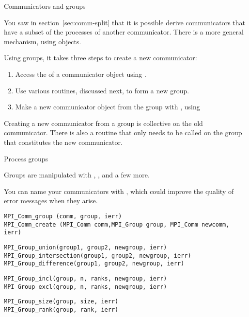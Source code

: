 
 {Communicators and groups}
\label{sec:mpi-comm-group}

You saw in section~\ref{sec:comm-split} that it is possible derive
communicators that have a subset of the processes of another communicator.
There is a more general mechanism, using 
objects.

Using groups, it takes three steps to create a new communicator:
\begin{enumerate}
\item Access the  of a communicator
  object using .
\item Use various routines, discussed next, to form a new group.
\item Make a new communicator object from the group with
  , using
\end{enumerate}

Creating a new communicator from a group is collective on the old communicator.
There is also a routine  that only
needs to be called on the group that constitutes the new communicator.

 {Process groups}
\label{sec:comm-group}

Groups are manipulated with
, ,
 and a few more.

You can name your communicators with , which
could improve the quality of error messages when they arise.

\begin{lstlisting}
MPI_Comm_group (comm, group, ierr)
MPI_Comm_create (MPI_Comm comm,MPI_Group group, MPI_Comm newcomm, ierr)
\end{lstlisting}

\begin{lstlisting}
MPI_Group_union(group1, group2, newgroup, ierr)
MPI_Group_intersection(group1, group2, newgroup, ierr)
MPI_Group_difference(group1, group2, newgroup, ierr)
\end{lstlisting}

\begin{lstlisting}
MPI_Group_incl(group, n, ranks, newgroup, ierr)
MPI_Group_excl(group, n, ranks, newgroup, ierr)
\end{lstlisting}
\begin{lstlisting}
MPI_Group_size(group, size, ierr)
MPI_Group_rank(group, rank, ierr)
\end{lstlisting}

